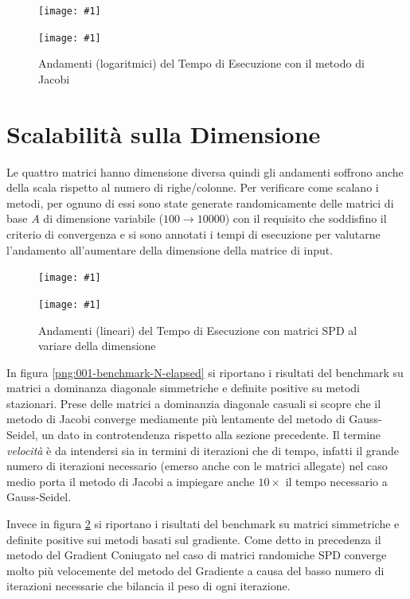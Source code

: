 \documentclass[a4paper,11pt,oneside, table]{article}
\newcommand{\putsubimage}[5] {
  \begin{minipage}{{#4}\linewidth}
	    \centering
      \texttt{[image: \#1]}
	    \caption{#2}\label{#3}
	\end{minipage}
}
\newcommand{\putimagecouple}[2] {
  \begin{figure}[!htb]
      \centering
      #1
      \hspace{0.5cm}
      #2
  \end{figure}
}
\begin{document}
\putimagecouple
  {\putsubimage{./images/te-re-gse.png}{Andamenti (logaritmici) del Tempo di Esecuzione con il metodo di Gauss Seidel}{png:te-re-gse}{0.4}{0.99}}
  {\putsubimage{./images/te-re-jae.png}{Andamenti (logaritmici) del Tempo di Esecuzione con il metodo di Jacobi}{png:te-re-jae}{0.4}{0.99}}

\section{Scalabilit\`a sulla Dimensione}

Le quattro matrici hanno dimensione diversa quindi gli andamenti soffrono anche della scala rispetto al numero di righe/colonne. Per verificare come scalano i metodi, per ognuno di essi sono state generate randomicamente delle matrici di base $A$ di dimensione variabile ($100 \rightarrow 10000$) con il requisito che soddisfino il criterio di convergenza e si sono annotati i tempi di esecuzione per valutarne l'andamento all'aumentare della dimensione della matrice di input.

\putimagecouple
  {\putsubimage{./images/001-benchmark-N-elapsed.png}{Andamenti (lineari) del Tempo di Esecuzione con matrici RDD al variare della dimensione}{png:001-benchmark-N-elapsed}{0.4}{0.99}}
  {\putsubimage{./images/002-benchmark-N-elapsed.png}{Andamenti (lineari) del Tempo di Esecuzione con matrici SPD al variare della dimensione}{png:002-benchmark-N-elapsed}{0.4}{0.99}}

In figura \ref{png:001-benchmark-N-elapsed} si riportano i risultati del benchmark su matrici a dominanza diagonale simmetriche e definite positive su metodi stazionari.
Prese delle matrici a dominanzia diagonale casuali si scopre che il metodo di Jacobi converge mediamente pi\`u lentamente del metodo di Gauss-Seidel, un dato in controtendenza rispetto alla sezione precedente.
Il termine \textit{velocit\`a} \`e da intendersi sia in termini di iterazioni che di tempo, infatti il grande numero di iterazioni necessario (emerso anche con le matrici allegate) nel caso medio porta il metodo di Jacobi a impiegare anche $10 \times$ il tempo necessario a Gauss-Seidel.

Invece in figura \ref{png:002-benchmark-N-elapsed} si riportano i risultati del benchmark su matrici simmetriche e definite positive sui metodi basati sul gradiente.
Come detto in precedenza il metodo del Gradient Coniugato nel caso di matrici randomiche SPD converge molto pi\`u velocemente del metodo del Gradiente a causa del basso numero di iterazioni necessarie che bilancia il peso di ogni iterazione.
\end{document}
